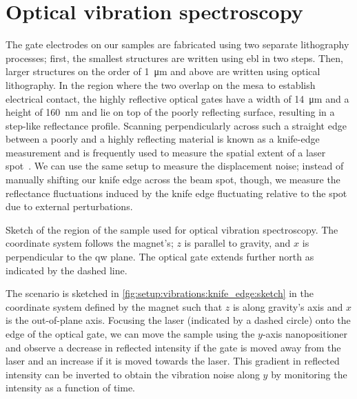 \section{Optical vibration spectroscopy}\label{sec:setup:vibrations:optic}
The gate electrodes on our samples are fabricated using two separate lithography processes; first, the smallest structures are written using \gls{ebl} in two steps.
Then, larger structures on the order of \qty{1}{\micro\meter} and above are written using optical lithography.
In the region where the two overlap on the mesa to establish electrical contact, the highly reflective  optical gates have a width of \qty{14}{\micro\meter} and a height of \qty{160}{\nano\meter} and lie on top of the poorly reflecting  surface, resulting in a step-like reflectance profile.
Scanning perpendicularly across such a straight edge between a poorly and a highly reflecting material is known as a knife-edge measurement and is frequently used to measure the spatial extent of a laser spot~\cite{Arnaud1971,Skinner1972,Khosrofian1983}.
We can use the same setup to measure the displacement noise; instead of manually shifting our knife edge across the beam spot, though, we measure the reflectance fluctuations induced by the knife edge fluctuating relative to the spot due to external perturbations.

\begin{marginfigure}[*-10]
    \centering
    
    \caption[]{
        Sketch of the region of the sample used for optical vibration spectroscopy.
        The coordinate system follows the magnet's; $z$ is parallel to gravity, and $x$ is perpendicular to the \gls{qw} plane.
        The optical gate extends further north as indicated by the dashed line.
    }
    \label{fig:setup:vibrations:knife_edge:sketch}
\end{marginfigure}

The scenario is sketched in \cref{fig:setup:vibrations:knife_edge:sketch} in the coordinate system defined by the magnet such that $z$ is along gravity's axis and $x$ is the out-of-plane axis.
Focusing the laser (indicated by a dashed circle) onto the edge of the optical gate, we can move the sample using the $y$-axis nanopositioner and observe a decrease in reflected intensity if the gate is moved away from the laser and an increase if it is moved towards the laser.
This gradient in reflected intensity can be inverted to obtain the vibration noise along $y$ by monitoring the intensity as a function of time.

